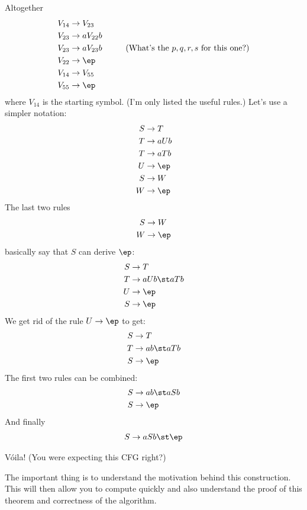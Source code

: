 Altogether
\begin{align*}
V_{14} &\rightarrow V_{23} \\
V_{23} &\rightarrow a V_{22} b \\
V_{23} &\rightarrow a V_{23} b  \hskip 1cm (\text{What's the $p,q,r,s$ for this one?})\\
V_{22} &\rightarrow \ep \\
V_{14} &\rightarrow V_{55} \\
V_{55} &\rightarrow \ep \\
\end{align*}
where $V_{14}$ is the starting symbol.
(I'm only listed the useful rules.)
Let's use a simpler notation:
\begin{align*}
S &\rightarrow T \\
T &\rightarrow a U b \\
T &\rightarrow a T b  \\
U &\rightarrow \ep \\
S &\rightarrow W \\
W &\rightarrow \ep \\
\end{align*}
The last two rules 
\begin{align*}
S &\rightarrow W \\
W &\rightarrow \ep \\
\end{align*}
basically say that $S$ can derive $\ep$:
\begin{align*}
S &\rightarrow T \\
T &\rightarrow a U b \st aTb \\
U &\rightarrow \ep \\
S &\rightarrow \ep
\end{align*}
We get rid of the rule $U \rightarrow \ep$ to get:
\begin{align*}
S &\rightarrow T \\
T &\rightarrow a b \st aTb \\
S &\rightarrow \ep
\end{align*}
The first two rules can be combined:
\begin{align*}
S &\rightarrow a b \st aSb \\
S &\rightarrow \ep
\end{align*}
And finally
\begin{align*}
S &\rightarrow aSb \st \ep \\
\end{align*}

V\'oila! (You were expecting this CFG right?)

The important thing is to understand the motivation behind this
construction.
This will then allow you to compute quickly and also understand the proof
of this theorem and correctness of the algorithm.






